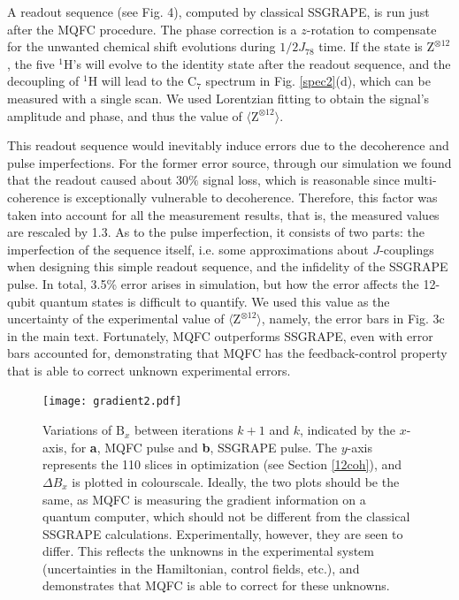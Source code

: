 \documentclass[twocolumn,reprint, amsmath,amssymb,showpacs,superscriptaddress]{revtex4-1}
\begin{document}
A readout sequence (see Fig. 4), computed by classical SSGRAPE, is run just after the MQFC procedure. The phase correction is a $z$-rotation to compensate for the unwanted chemical shift evolutions during $1/2J_{78}$ time. If the state is $\text{Z}^{\otimes 12}$, the five $^1$H's will   evolve to the identity state after the readout sequence, and the decoupling of $^1$H will lead to the C$_7$ spectrum in Fig. \ref{spec2}(d), which can be measured with a single scan. We used Lorentzian fitting to obtain the signal's amplitude and phase, and thus the value of $\langle \text{Z}^{\otimes 12} \rangle$.

This readout sequence would inevitably induce errors due to  the decoherence and pulse imperfections. For the former error source, through our simulation we found that the readout caused about $30\%$ signal loss, which is reasonable since multi-coherence is exceptionally vulnerable to decoherence. Therefore, this factor was taken into account for all the measurement results, that is, the measured values are rescaled by 1.3. As to the pulse imperfection, it consists of two parts: the imperfection of the sequence itself, i.e. some approximations about $J$-couplings when designing this simple readout sequence, and the infidelity of the SSGRAPE pulse. In total, 3.5\% error arises in simulation, but how the error affects the 12-qubit quantum states is difficult to quantify. We used this value as the uncertainty of the experimental value of $\langle \text{Z}^{\otimes 12} \rangle$, namely, the error bars in Fig. 3c in the main text. Fortunately, MQFC outperforms SSGRAPE, even with error bars accounted for, demonstrating that MQFC has the feedback-control property that is able to correct unknown experimental errors.

\begin{figure}[t]
\begin{center}
\texttt{[image: gradient2.pdf]}
\end{center}
\makeatletter
\renewcommand{\thefigure}{S\@arabic\c@figure}
\makeatother
\caption{Variations of $\text{B}_x$ between iterations $k+1$ and $k$, indicated by the $x$-axis, for \textbf{a}, MQFC pulse and \textbf{b}, SSGRAPE pulse. The $y$-axis represents the 110 slices in optimization (see Section \ref{12coh}), and $\Delta B_x$ is plotted in colourscale. Ideally, the two plots should be the same, as MQFC is measuring the gradient information on a quantum computer, which should not be different from the classical SSGRAPE calculations. Experimentally, however, they are seen to differ. This reflects the unknowns in the experimental system (uncertainties in the Hamiltonian, control fields, etc.), and demonstrates that MQFC is able to correct for these unknowns. }
\label{gradient}
\end{figure}
\end{document}
